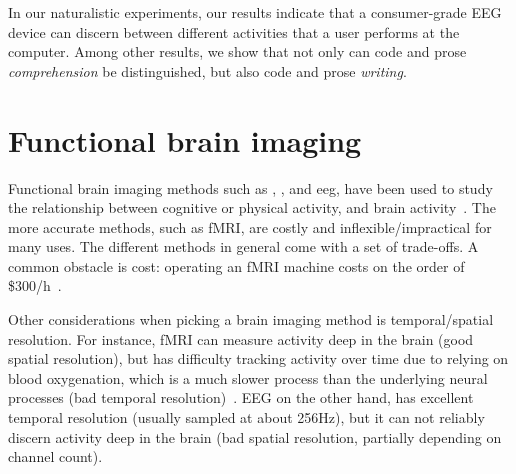 In our naturalistic experiments, our results indicate that a consumer-grade EEG device can discern between different activities that a user performs at the computer. Among other results, we show that not only can code and prose \emph{comprehension} be distinguished, but also code and prose \emph{writing}.

% 
%
%
%




\section{Functional brain imaging}\label{section:imaging}

    Functional brain imaging methods such as , , and \gls{eeg}, have been used to study the relationship between cognitive or physical activity, and brain activity~\cite{floyd_decoding_2017, hong_classification_2015, fucci_replication_2019}. The more accurate methods, such as fMRI, are costly and inflexible/impractical for many uses. The different methods in general come with a set of trade-offs. A common obstacle is cost: operating an fMRI machine costs on the order of \$300/h~\cite{fucci_replication_2019}. 

    Other considerations when picking a brain imaging method is temporal/spatial resolution. For instance, fMRI can measure activity deep in the brain (good spatial resolution), but has difficulty tracking activity over time due to relying on blood oxygenation, which is a much slower process than the underlying neural processes (bad temporal resolution)~\cite{glover_overview_2011}. EEG on the other hand, has excellent temporal resolution (usually sampled at about 256Hz), but it can not reliably discern activity deep in the brain (bad spatial resolution, partially depending on channel count).

